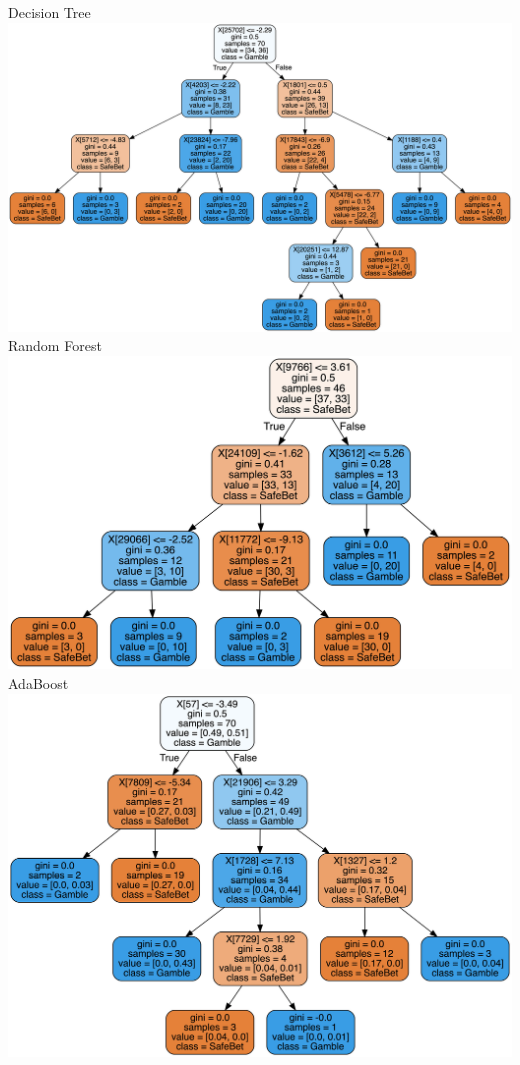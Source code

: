 \documentclass[11pt]{article}
\makeatletter
\def\maxwidth{\ifdim\Gin@nat@width>\linewidth\linewidth
    \else\Gin@nat@width\fi}
\let\Oldincludegraphics\includegraphics
\renewcommand{\includegraphics}[1]{\Oldincludegraphics[width=.8\maxwidth]{#1}}
\makeatother
\begin{document}
Decision Tree 
\includegraphics{dt_tree.png}
Random Forest
\includegraphics{rand_tree.png}
AdaBoost
\includegraphics{ada_tree.png}
\end{document}
